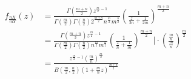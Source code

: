 \documentclass[a4paper]{article}
\begin{document}
\begin{align*}
	f_{ \frac{nX}{mY} }(z) &= \frac{
		\Gamma \left( 
	\frac{ m+n }{ 2 }
\right) z ^{\frac{ m }{ 2 }-1} }{ 
				\Gamma(\frac{ m }{ 2 }) \Gamma(\frac{ n }{ 2 })
						2 ^{\frac{ m+n }{ 2 }} 
								n ^{\frac{ m }{ 2 }} m ^{\frac{ n }{ 2 }}
									}
									\left( 
												\frac{ 1 }{ 
																\frac{ z }{ 2n } + \frac{ 1 }{ 2m }
																		}
																				\right) ^{
																						\frac{ m+n }{2}
																							} \\
	&= \frac{
		\Gamma \left( 
	\frac{ m+n }{ 2 }
\right) z ^{\frac{ m }{ 2 }-1} }{ 
				\Gamma(\frac{ m }{ 2 }) \Gamma(\frac{ n }{ 2 })
								n ^{\frac{ m }{ 2 }} m ^{\frac{ n }{ 2 }}
									}
								\left( 
									\frac{ 1 }{ 
								\frac{ z }{ n } + \frac{ 1 }{ m }
							}
						\right) ^{
					\frac{ m+n }{2}
				} \Bigg \vert \cdot \left( \frac{ \frac{ m }{ n } }{ \frac{ m }{ n } } \right) ^{\frac{ m }{ 2 }}\\
	&= \frac{ z ^{ \frac{ m }{ 2 } -1} \left( 
			\frac{ m }{ n }
			\right) ^{ \frac{ m }{ 2 } }  }{ B \left( 
	\frac{ m }{ 2 }, \frac{ n }{ 2 }\right) \left( 
	1+ \frac{ m }{ n }z
	\right) ^{ \frac{ m+n }{ 2 } } } \\
\end{align*}
\end{document}
